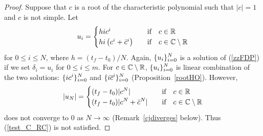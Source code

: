 \begin{proof}
Suppose that $c$ is a root of the characteristic polynomial such that
$|c|=1$ and $c$ is not simple.  Let
\[
u_i = \begin{cases}
h i c^i & \quad \text{if} \quad c \in \mathbb{R} \\
h i \left( c^i + \bar{c}^i \right) & \quad \text{if}\quad  c \in \mathbb{C}
\setminus \mathbb{R}
\end{cases}
\]
for $0 \leq i \leq N$, where $h = (t_f-t_0)/N$.
Again, $\displaystyle \{u_i\}_{i=0}^N$ is a solution of (\ref{zzFDP}) if we set
$\delta_i = u_i$ for $0\leq i \leq m$.
For $c \in \mathbb{C} \setminus \mathbb{R}$, $\displaystyle \{u_i\}_{i=0}^N$ is linear
combination of the two solutions: 
$\displaystyle \{i c^i\}_{i=0}^N$ and
$\displaystyle \{i \overline{c}^i\}_{i=0}^N$ (Proposition~\ref{rootHO}).
However,
\[
|u_N| =
\begin{cases}
\displaystyle
(t_f-t_0) |c^N| & \quad \text{if} \quad c \in \mathbb{R} \\
\displaystyle
(t_f-t_0) |c^N + \bar{c}^N| & \quad \text{if} \quad c \in \mathbb{C} \setminus \mathbb{R}
\end{cases}
\]
does not converge to $0$ as $N \to \infty$ (Remark~\ref{cjdiverges} below).
Thus (\ref{test_C_RC}) is not satisfied.
\end{proof}

